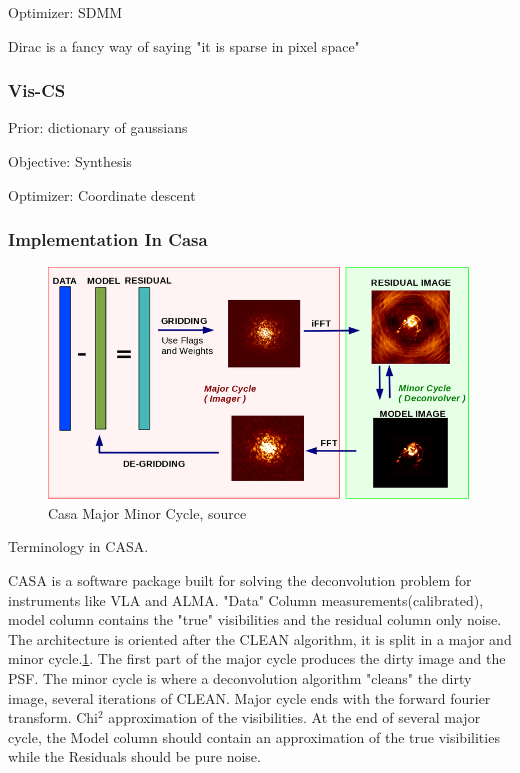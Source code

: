 Optimizer: SDMM

Dirac is a fancy way of saying "it is sparse in pixel space"


\subsubsection{Vis-CS}
Prior: dictionary of gaussians

Objective: Synthesis

Optimizer: Coordinate descent


\subsubsection{Implementation In Casa}

\begin{figure}
	\centering
	\vspace{-15pt}
	\includegraphics[width=0.9\linewidth]{./chapters/04.cs/img/casa_major_minor.png}
	\caption{Casa Major Minor Cycle, source \cite{casa2018major}}
	\label{cs:major}
	\vspace{-15pt}
\end{figure}
Terminology in CASA.

CASA is a software package built for solving the deconvolution problem for instruments like VLA and ALMA. "Data" Column measurements(calibrated), model column contains the "true" visibilities and the residual column only noise. The architecture is oriented after the CLEAN algorithm, it is split in a major and minor cycle.\ref{cs:major}. The first part of the major cycle produces the dirty image and the PSF. The minor cycle is where a deconvolution algorithm "cleans" the dirty image, several iterations of CLEAN. Major cycle ends with the forward fourier transform. Chi$^2$ approximation of the visibilities. At the end of several major cycle, the Model column should contain an approximation of the true visibilities while the Residuals should be pure noise.

